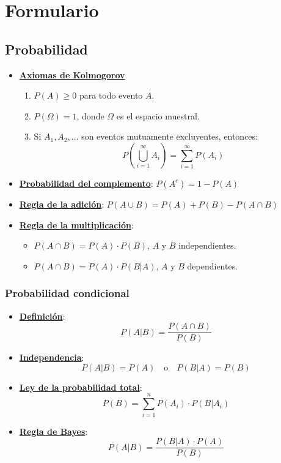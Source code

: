 \section{Formulario}


\subsection{Probabilidad}
\begin{itemize}
    \item \hyperref[sec:axiomasKolmogorov]{\textbf{Axiomas de Kolmogorov}}

    \begin{enumerate}
        \item $P(A) \geq 0$ para todo evento $A$. 
        \item $P(\Omega) = 1$, donde $\Omega$ es el espacio muestral. 
        \item Si $A_1, A_2, \ldots$ son eventos mutuamente excluyentes, entonces:
        \[
          P\left(\bigcup_{i=1}^{\infty} A_i\right) = \sum_{i=1}^{\infty} P(A_i)
        \]
    \end{enumerate}

    \item \hyperref[sec:probComplemento]{\textbf{Probabilidad del complemento}}:
    $P(A^c) = 1 - P(A)$

    \item \hyperref[sec:reglaAdicion]{\textbf{Regla de la adición}}: 
    $P(A \cup B) = P(A) + P(B) - P(A \cap B)$

    \item \hyperref[sec:reglaMultiplicacion]{\textbf{Regla de la multiplicación}}:
    \begin{itemize}
      \item $P(A \cap B) = P(A) \cdot P(B)$, $A$ y $B$ independientes.
      \item $P(A \cap B) = P(A) \cdot P(B|A)$, $A$ y $B$ dependientes.
    \end{itemize}
\end{itemize}

\subsubsection{Probabilidad condicional}
\begin{itemize}
    \item \hyperref[sec:probabilidadCondicional]{\textbf{Definición}}: $$P(A|B) = \frac{P(A \cap B)}{P(B)}$$

    \item \hyperref[sec:independencia]{\textbf{Independencia}}: $$P(A|B) = P(A) \quad \text{o} \quad P(B|A) = P(B)$$

    \item \hyperref[sec:leyProbTotal]{\textbf{Ley de la probabilidad total}}: $$P(B) = \sum_{i=1}^{n} P(A_i) \cdot P(B|A_i)$$

    \item \hyperref[sec:reglaBayes]{\textbf{Regla de Bayes}}: $$P(A|B) = \frac{P(B|A) \cdot P(A)}{P(B)}$$
\end{itemize}

